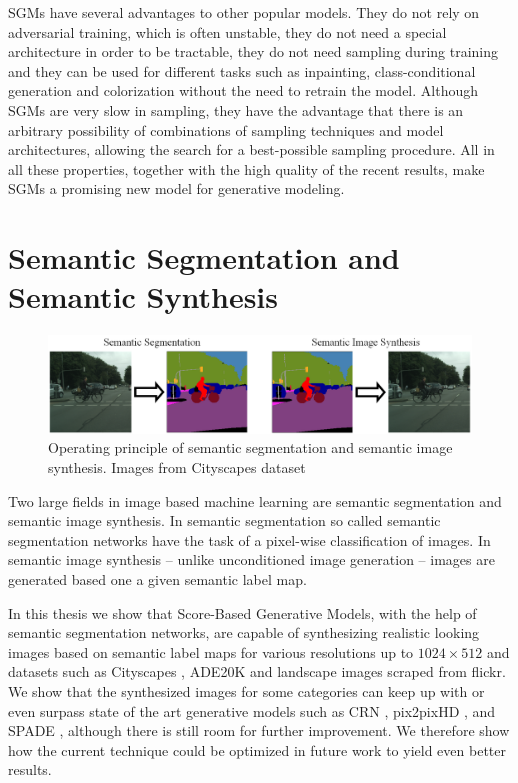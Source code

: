 \thispagestyle{plain}
SGMs have several advantages to other popular models. They do not rely on adversarial training, which is often unstable, they do not need a special architecture in order to be tractable, they do not need sampling during training and they can be used for different tasks such as inpainting, class-conditional generation and colorization without the need to retrain the model. Although SGMs are very slow in sampling, they have the advantage that there is an arbitrary possibility of combinations of sampling techniques and model architectures, allowing the search for a best-possible sampling procedure. All in all these properties, together with the high quality of the recent results, make SGMs a promising new model for generative modeling.
\section{Semantic Segmentation and Semantic Synthesis} 
\thispagestyle{plain}
%
\begin{figure}[h!]
    \centering
    \includegraphics[width=1\textwidth]{Chapters/figures/sem_seg_vs_sem_synth.PNG}
    \caption[Operating principle of semantic segmentation and semantic image synthesis]{Operating principle of semantic segmentation and semantic image synthesis. Images from Cityscapes dataset \cite{cityscapes}}
\end{figure}
%
Two large fields in image based machine learning are semantic segmentation and semantic image synthesis. In semantic segmentation so called semantic segmentation networks have the task of a pixel-wise classification of images. In semantic image synthesis – unlike unconditioned image generation \cite{score_3} – images are generated based one a given semantic label map.

In this thesis we show that Score-Based Generative Models, with the help of semantic segmentation networks, are capable of synthesizing realistic looking images based on semantic label maps for various resolutions up to $1024\times512$ and datasets such as Cityscapes \cite{cityscapes}, ADE20K \cite{ade20k} and landscape images scraped from flickr. We show that the synthesized images for some categories can keep up with or even surpass state of the art generative models such as CRN \cite{crn}, pix2pixHD \cite{pix2pixHD}, and SPADE \cite{spade}, although there is still room for further improvement. We therefore show how the current technique could be optimized in future work to yield even better results. 

